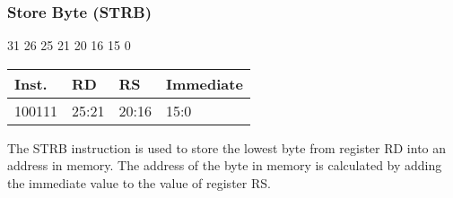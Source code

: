 \documentclass[12pt]{article}
\begin{document}

    \newpage
    \subsubsection{Store Byte (STRB)}
    
    \hspace{1.6cm}31 \hspace{1.15cm}26 \hspace{.05cm}25 \hspace{.8cm}21 \hspace{.05cm}20 \hspace{.8cm}16 \hspace{.05cm}15 \hspace{6.4cm}0
    \vspace{-.25cm}
    \begin{center}
        \begin{tabular}{ |p{1.8cm}|p{1.5cm}|p{1.5cm}|p{6.8cm}| }
            \hline
            \textbf{Inst.} & \textbf{RD} &  \textbf{RS} & \textbf{Immediate}\\
            \hline
            100111& 25:21 & 20:16 &15:0\\
            \hline
        \end{tabular}
    \end{center}
    
    \noindent
    The STRB instruction is used to store the lowest byte from register RD into an address in memory. The address of the byte in memory is calculated by adding the immediate value to the value of register RS. 
    
\end{document}
